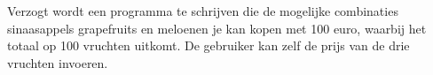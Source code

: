 Verzogt  wordt een programma te schrijven die de mogelijke combinaties sinaasappels grapefruits en meloenen je kan kopen met 100 euro, waarbij het totaal op 100 vruchten uitkomt.
De gebruiker kan zelf de prijs van de drie vruchten invoeren.
